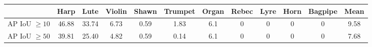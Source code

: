 \begin{tabular}{c|c|c|c|c|c|c|c|c|c|c||c}\hline
		& Harp & Lute & Violin & Shawn & Trumpet  & Organ & Rebec & Lyre & Horn & Bagpipe & Mean\\ \hline \hline 
	AP IoU $\geq10$ &  46.88         &  33.74    &  6.73          &  0.59       & 1.83 & 6.1 & 0 & 0 & 0 & 0 & 9.58  \\
	AP IoU $\geq50$ & 39.81         &  25.40    &  4.82          &  0.59       & 0.14 & 6.1 & 0 & 0 & 0 & 0 & 7.68 
\end{tabular}
